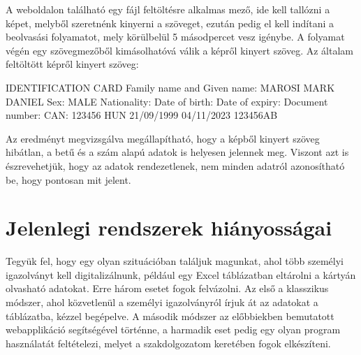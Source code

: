 \documentclass[12pt]{report}
\begin{document}
A weboldalon található egy fájl feltöltésre alkalmas mező, ide kell tallózni a képet, melyből szeretnénk kinyerni a szöveget, ezután pedig el kell indítani a beolvasási folyamatot, mely körülbelül 5 másodpercet vesz igénybe. A folyamat végén egy szövegmezőből kimásolhatóvá válik a képről kinyert szöveg. Az általam feltöltött képről kinyert szöveg:
\newline
\begin{tcolorbox}
    IDENTIFICATION CARD Family name and Given name: MAROSI MARK DANIEL Sex: MALE Nationality: Date of birth: Date of expiry: Document number: CAN: 123456 HUN 21/09/1999 04/11/2023 123456AB
\end{tcolorbox}
\newline
Az eredményt megvizsgálva megállapítható, hogy a képből kinyert szöveg hibátlan, a betű és a szám alapú adatok is helyesen jelennek meg. Viszont azt is észrevehetjük, hogy az adatok rendezetlenek, nem minden adatról azonosítható be, hogy pontosan mit jelent.

\section{Jelenlegi rendszerek hiányosságai}

Tegyük fel, hogy egy olyan szituációban találjuk magunkat, ahol több személyi igazolványt kell digitalizálnunk, például egy Excel táblázatban eltárolni a kártyán olvasható adatokat. Erre három esetet fogok felvázolni. Az első a klasszikus módszer, ahol közvetlenül a személyi igazolványról írjuk át az adatokat a táblázatba, kézzel begépelve. A második módszer az előbbiekben bemutatott webapplikáció segítségével történne, a harmadik eset pedig egy olyan program használatát feltételezi, melyet a szakdolgozatom keretében fogok elkészíteni.
\end{document}
